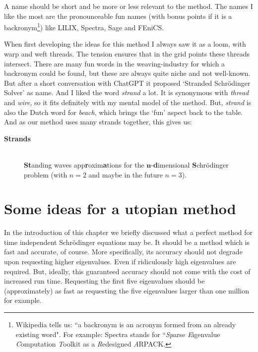 A name should be short and be more or less relevant to the method. The names I like the most are the pronounceable fun names (with bonus points if it is a backronym\footnote{Wikipedia tells us: ``a backronym is an acronym formed from an already existing word". For example: Spectra stands for ``\emph{Sp}arse \emph{E}igenvalue \emph{C}omputation \emph{T}oolkit as a \emph{R}edesigned \emph{A}RPACK.}) like LILIX, Spectra, Sage and FEniCS.

When first developing the ideas for this method I always saw it as a loom, with warp and weft threads. The tension ensures that in the grid points these threads intersect. There are many fun words in the weaving-industry for which a backronym could be found, but these are always quite niche and not well-known. But after a short conversation with ChatGPT it proposed `Stranded Schrödinger Solver' as name. And I liked the word \emph{strand} a lot. It is synonymous with \emph{thread} and \emph{wire}, so it fits definitely with my mental model of the method. But, \emph{strand} is also the Dutch word for \emph{beach}, which brings the `fun' aspect back to the table. And as our method uses many strands together, this gives us:


\begin{center}
    \begin{minipage}{.8\textwidth}
        \begin{description}
            \item[\textbf{Strands}] \hfill\\ \textbf{St}anding waves app\textbf{r}oxim\textbf{a}tions for the $\bm{n}$-\textbf{d}imensional \textbf{S}chrödinger problem (with $n = 2$ and maybe in the future $n = 3$).
        \end{description}
    \end{minipage}
\end{center}

\section{Some ideas for a utopian method}\label{c4:sec_utopy}

In the introduction of this chapter we briefly discussed what a perfect method for time independent Schrödinger equations may be. It should be a method which is fast and accurate, of course. More specifically, its accuracy should not degrade upon requesting higher eigenvalues. Even if ridiculously high eigenvalues are required. But, ideally, this guaranteed accuracy should not come with the cost of increased run time. Requesting the first five eigenvalues should be (approximately) as fast as requesting the five eigenvalues larger than one million for example.

